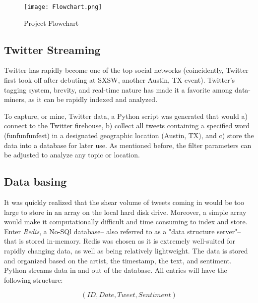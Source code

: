 \documentclass{article}
\begin{document}
\begin{figure}[!ht]
\begin{center}
\texttt{[image: Flowchart.png]}
\caption{Project Flowchart}
\end{center}
\end{figure}

\subsection{Twitter Streaming}
Twitter has rapidly become one of the top social networks (coincidently, Twitter first took off after debuting at SXSW, another Austin, TX event). Twitter's tagging system, brevity, and real-time nature has made it a favorite among data-miners, as it can be rapidly indexed and analyzed. \*

To capture, or mine, Twitter data, a Python script was generated that would a) connect to the Twitter firehouse, b) collect all tweets containing a specified word (funfunfunfest) in a designated geographic location (Austin, TX), and c) store the data into a database for later use. As mentioned before, the filter parameters can be adjusted to analyze any topic or location. \*

\subsection{Data basing}
It was quickly realized that the shear volume of tweets coming in would be too large to store in an array on the local hard disk drive. Moreover, a simple array would make it computationally difficult and time consuming to index and store. Enter \emph{Redis}, a No-SQl database-- also referred to as a "data structure server"-- that is stored in-memory. Redis was chosen as it is extremely well-suited for rapidly changing data, as well as being relatively lightweight. The data is stored and organized based on the artist, the timestamp, the text, and sentiment. Python streams data in and out of the database. All entries will have the following structure: 

\begin{equation}
(ID, Date, Tweet, Sentiment)
\end{equation}
\end{document}
